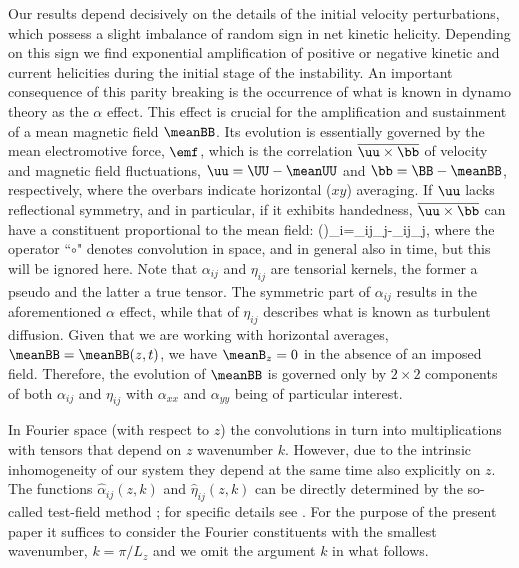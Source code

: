 \documentclass[twocolumn,showpacs,preprintnumbers,superscriptaddress]{revtex4}
\begin{document}
Our results depend decisively on the details of the initial velocity
perturbations, which possess a slight imbalance of random sign
in net kinetic helicity. 
Depending on this sign
we find exponential amplification of positive or negative kinetic
and current helicities during the initial stage of the instability.
An important consequence of this parity breaking is the occurrence of
what is known in dynamo theory as the $\alpha$ effect.
This effect is
crucial for the amplification and sustainment of a
mean magnetic field $\meanBB$. Its
evolution is essentially governed by 
the mean electromotive force, $\emf$, which is the
correlation $\overline{\uu\times\bb}$ of velocity
and magnetic field fluctuations,
$\uu=\UU-\meanUU$ and $\bb=\BB-\meanBB$, respectively,
where the overbars indicate horizontal
($xy$)
averaging.
If $\uu$ lacks reflectional symmetry, and in particular, if it exhibits
handedness, $\overline{\uu\times\bb}$ can have a constituent
proportional to the mean field:
\EQ
(\overline{\uu\times\bb})_i=\alpha_{ij}\circ\meanB_j-\eta_{ij}\circ\meanJ_j,
\label{uxb}
\EN
where the operator ``$\circ$" denotes convolution in space, and in
general also in time, but this will be ignored here.
Note that $\alpha_{ij}$ and $\eta_{ij}$ are tensorial kernels,
the former a pseudo and the latter a true tensor.
The symmetric part of $\alpha_{ij}$ results in the
aforementioned $\alpha$ effect, while that of $\eta_{ij}$
describes what is known as turbulent diffusion.
Given that we are working with horizontal averages,
$\meanBB=\meanBB(z,t)$, we have $\meanB_z=0$ in the absence of
an imposed field.
Therefore, the evolution of $\meanBB$ is governed only by $2\times2$
components of both $\alpha_{ij}$ and $\eta_{ij}$ with 
$\alpha_{xx}$ and $\alpha_{yy}$ being of particular interest.

In Fourier space (with respect to $z$) the convolutions in  
turn into multiplications with tensors that depend on $z$ wavenumber $k$.
However, due to the intrinsic inhomogeneity of our system
they depend at the same time also explicitly on $z$. 
The
functions $\hat{\alpha}_{ij}(z,k)$ and $\hat{\eta}_{ij}(z,k)$
can be directly determined by the so-called test-field method
\cite{Sch05,Sch07}; for specific details see \cite{CMRB10}.
For the purpose of the present paper it suffices to consider
the Fourier constituents with the smallest wavenumber,
$k= \pi/L_z$ and we omit the argument $k$ in what follows.
\end{document}
